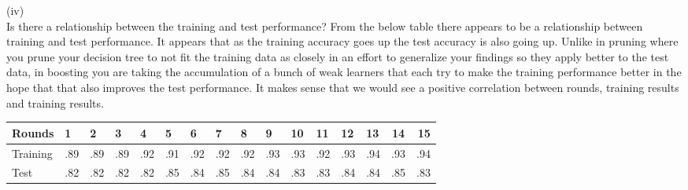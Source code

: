 \documentclass[solution, letterpaper]{cs121}
\begin{document}
(iv) \\
Is there a relationship between the training and test performance?
From the below table there appears to be a relationship between training and test performance. It appears that as the training accuracy goes up the test accuracy is also going up. Unlike in pruning where you prune your decision tree to not fit the training data as closely in an effort to generalize your findings so they apply better to the test data, in boosting you are taking the accumulation of a bunch of weak learners that each try to make the training performance better in the hope that that also improves the test performance. It makes sense that we would see a positive correlation between rounds, training results and training results.\\

\begin{tabular}{ l | l l l l l l l l l l l l l c r }
  Rounds & 1 & 2 & 3 & 4 & 5 & 6 & 7 & 8 & 9 & 10 & 11 & 12 & 13 & 14 & 15 \\ \hline
  Training & .89 & .89 & .89 & .92 & .91 & .92 & .92 & .92 & .93 & .93 & .92 & .93 & .94 & .93 & .94 \\
   Test & .82 & .82 & .82 & .82 & .85 & .84 & .85 & .84 & .84 & .83 & .83 & .84 & .84 & .85 & .83 \\
  \end{tabular}
  
  
\end{document}
